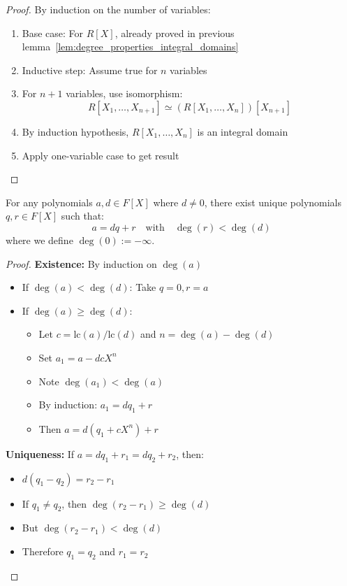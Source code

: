 \begin{proof}
  By induction on the number of variables:
  \begin{enumerate}
    \item Base case: For $R[X]$, already proved in previous lemma~\ref{lem:degree_properties_integral_domains}
    \item Inductive step: Assume true for $n$ variables
    \item For $n+1$ variables, use isomorphism:
      \[
        R[X_1,\ldots,X_{n+1}] \simeq (R[X_1,\ldots,X_n])[X_{n+1}]
      \]
    \item By induction hypothesis, $R[X_1,\ldots,X_n]$ is an integral domain
    \item Apply one-variable case to get result
  \end{enumerate}
\end{proof}

\begin{proposition}
  For any polynomials $a,d \in F[X]$ where $d \neq 0$, there exist unique polynomials $q,r \in F[X]$ such that:
  \[
    a = dq + r \quad \text{with} \quad \deg(r) < \deg(d)
  \]
  where we define $\deg(0) := -\infty$.
\end{proposition}

\begin{proof}
  \textbf{Existence:} By induction on $\deg(a)$
  \begin{itemize}
    \item If $\deg(a) < \deg(d)$: Take $q=0, r=a$
    \item If $\deg(a) \geq \deg(d)$:
      \begin{itemize}
        \item Let $c = \text{lc}(a)/\text{lc}(d)$ and $n = \deg(a) - \deg(d)$
        \item Set $a_1 = a - dcX^n$
        \item Note $\deg(a_1) < \deg(a)$
        \item By induction: $a_1 = dq_1 + r$
        \item Then $a = d(q_1 + cX^n) + r$
      \end{itemize}
  \end{itemize}

  \textbf{Uniqueness:} If $a = dq_1 + r_1 = dq_2 + r_2$, then:
  \begin{itemize}
    \item $d(q_1 - q_2) = r_2 - r_1$
    \item If $q_1 \neq q_2$, then $\deg(r_2 - r_1) \geq \deg(d)$
    \item But $\deg(r_2 - r_1) < \deg(d)$
    \item Therefore $q_1 = q_2$ and $r_1 = r_2$
  \end{itemize}
\end{proof}


